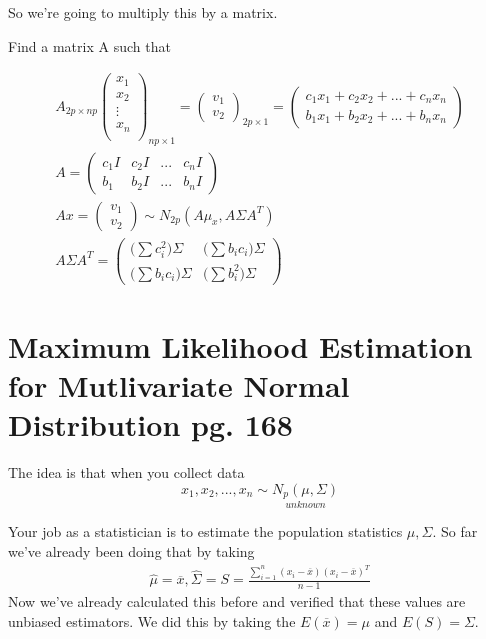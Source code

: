 So we're going to multiply this by a matrix.

Find a matrix A such that

\begin{gather*}
    A_{2p \times np}\begin{pmatrix}
    x_1\\
    x_2\\
    \vdots\\
    x_n\\
    \end{pmatrix}_{np \times 1} = \begin{pmatrix}
    v_1 \\ v_2
    \end{pmatrix}_{2p \times 1} = \begin{pmatrix}
    c_1x_1 + c_2x_2 + ...+ c_n x_n \\ b_1x_1 + b_2x_2 + ...+ b_n x_n
    \end{pmatrix} \\
    A =\begin{pmatrix}
    c_1I & c_2I & ...& c_nI \\ b_1 &  b_2I & ...& b_n I
    \end{pmatrix} \\
    Ax = \begin{pmatrix}
    v_1 \\v_2
    \end{pmatrix}\sim N_{2p}(A\mu_x,A\Sigma A^T)
    \\
    A\Sigma A^T = \begin{pmatrix}
\big(\sum c_i^2\big)\Sigma & \big(\sum b_ic_i\big) \Sigma \\
\big(\sum b_ic_i\big) \Sigma  &
\big(\sum b_i^2\big)\Sigma
\end{pmatrix}
\end{gather*}

\section{Maximum Likelihood Estimation for Mutlivariate Normal Distribution pg. 168}
The idea is that when you collect data
\[x_1,x_2,...,x_n \sim \underset{unknown}{N_p(\mu,\Sigma)}\]

Your job as a statistician is to estimate the population statistics \(\mu,\Sigma\). So far we've already been doing that by taking 
\begin{gather*}
    \hat \mu =\overline{x}, 
    \hat\Sigma = S = \frac{\sum_{i=1}^n(x_i-\overline{x})(x_i-\overline{x})^T}{n-1}
\end{gather*}
Now we've already calculated this before and verified that these values are unbiased estimators. We did this by taking the $E(\overline{x})=\mu$ and $E(S)=\Sigma$.


